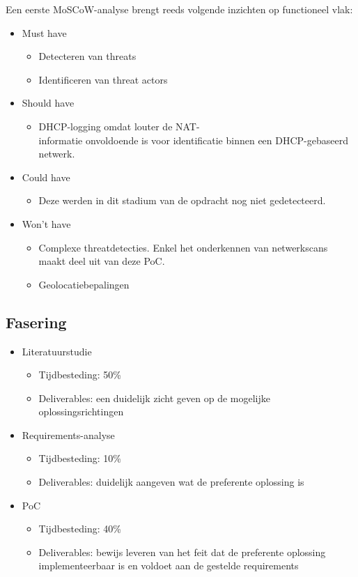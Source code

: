 Een eerste MoSCoW-analyse brengt reeds volgende inzichten op functioneel vlak:
\begin{itemize}
    \item Must have
        \begin{itemize}
            \item Detecteren van threats
            \item Identificeren van threat actors
        \end{itemize}
    \item Should have
        \begin{itemize}
            \item DHCP-logging omdat louter de NAT-\\informatie onvoldoende is voor identificatie binnen een DHCP-gebaseerd netwerk.
        \end{itemize}
    \item Could have
        \begin{itemize}
            \item Deze werden in dit stadium van de opdracht nog niet gedetecteerd.
        \end{itemize}
    \item Won't have
        \begin{itemize}
            \item  Complexe threatdetecties. Enkel het onderkennen van netwerkscans maakt deel uit van deze PoC.
            \item Geolocatiebepalingen
        \end{itemize}
\end{itemize}

\subsection{Fasering}

\begin{itemize}
    \item Literatuurstudie
        \begin{itemize}
            \item Tijdbesteding: 50\%
            \item Deliverables: een duidelijk zicht geven op de mogelijke oplossingsrichtingen
        \end{itemize}
    \item Requirements-analyse
        \begin{itemize}
            \item Tijdbesteding: 10\%
            \item Deliverables: duidelijk aangeven wat  de preferente oplossing is
        \end{itemize}
    \item PoC
        \begin{itemize}
            \item Tijdbesteding: 40\%
            \item Deliverables: bewijs leveren van het feit dat de preferente oplossing implementeerbaar is en voldoet aan de gestelde requirements
        \end{itemize}
\end{itemize}

